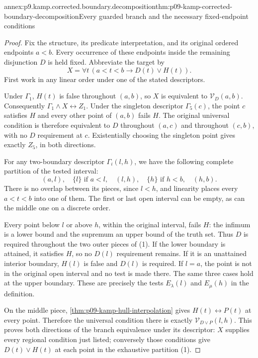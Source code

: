 \begin{annexitem}{annex:p9.kamp.corrected.boundary.decomposition}{thm:p09-kamp-corrected-boundary-decomposition}{Every guarded branch and the necessary fixed-endpoint conditions}
\begin{proof}
Fix the structure, its predicate interpretation, and its original
ordered endpoints \(a<b\). Every occurrence of these endpoints
inside the remaining disjunction \(D\) is held fixed.
Abbreviate the target by
\[
                    X=\forall t\,(a<t<b\to D(t)\lor H(t)).
\]
First work in any linear order under one of the stated descriptors.

Under \(\Gamma_1\), \(H(t)\) is false throughout
\((a,b)\), so \(X\) is equivalent to
\(\mathcal V_D(a,b)\). Consequently
\(\Gamma_1\land X\longleftrightarrow Z_1\).
Under the singleton descriptor \(\Gamma_5(c)\),
the point \(c\) satisfies \(H\) and every other point
of \((a,b)\) fails \(H\). The original universal condition
is therefore equivalent to \(D\) throughout \((a,c)\)
and throughout \((c,b)\), with no \(D\) requirement at
\(c\). Existentially choosing the singleton point gives
exactly \(Z_5\), in both directions.

For any two-boundary descriptor \(\Gamma_i(l,h)\), we have
the following complete partition of the tested interval:
\[
       (a,l),\quad \{l\}\text{ if }a<l,
       \quad(l,h),\quad \{h\}\text{ if }h<b,
       \quad(h,b).
 \tag{1}
\]
There is no overlap between its pieces, since \(l<h\),
and linearity places every \(a<t<b\) into one of them.
The first or last open interval can be empty, as can the middle
one on a discrete order.

Every point below \(l\) or above \(h\), within the original
interval, fails \(H\): the infimum is a lower bound and
the supremum an upper bound of the truth set. Thus \(D\)
is required throughout the two outer pieces of (1).
If the lower boundary is attained, it satisfies \(H\), so
no \(D(l)\) requirement remains. If it is an unattained
interior boundary, \(H(l)\) is false and \(D(l)\) is
required. If \(l=a\), the point is not in the original
open interval and no test is made there. The same three cases
hold at the upper boundary. These are precisely the tests
\(E_\lambda(l)\) and \(E_\mu(h)\) in the definition.

On the middle piece, \cref{thm:p09-kamp-hull-interpolation}
gives \(H(t)\longleftrightarrow P(t)\) at every point.
Therefore the universal condition there is exactly
\(\mathcal V_{D\lor P}(l,h)\). This proves both directions
of the branch equivalence under its descriptor: \(X\) supplies
every regional condition just listed; conversely those conditions
give \(D(t)\lor H(t)\) at each point in the exhaustive
partition (1).


\end{proof}
\end{annexitem}
